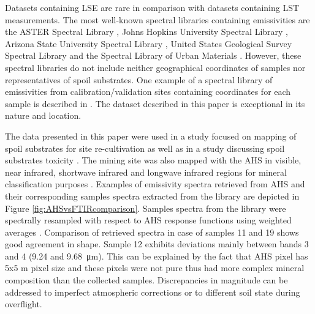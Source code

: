 \begin{appendices}
Datasets containing LSE are rare in comparison with datasets containing LST measurements. The most well-known spectral libraries containing emissivities are the ASTER Spectral Library \cite{BH09}, Johns Hopkins University Spectral Library \cite{SW91}, Arizona State University Spectral Library \cite{CB00}, United States Geological Survey Spectral Library \cite{CS16} and the Spectral Library of Urban Materials \cite{KS14}. However, these spectral libraries do not include neither geographical coordinates of samples nor representatives of spoil substrates. One example of a spectral library of emissivities from calibration/validation sites containing coordinates for each sample is described in \cite{SM09}. The dataset described in this paper is exceptional in its nature and location. 

The data presented in this paper were used in a study focused on mapping of spoil substrates for site re-cultivation \cite{Z14} as well as in a study discussing spoil substrates toxicity \cite{FK05}. The mining site was also mapped with the AHS in visible, near infrared, shortwave infrared and longwave infrared regions for mineral classification purposes \cite{NK14}. Examples of emissivity spectra retrieved from AHS and their corresponding samples spectra extracted from the library are depicted in Figure \ref{fig:AHSvsFTIRcomparison}. Samples spectra from the library were spectrally resampled with respect to AHS response functions using weighted averages \cite{LT13}. Comparison of retrieved spectra in case of samples 11 and 19 shows good agreement in shape. Sample 12 exhibits deviations mainly between bands 3 and 4 (9.24 and \SI{9.68}{\micro\meter}). This can be explained by the fact that AHS pixel has 5x5 m pixel size and these pixels were not pure thus had more complex mineral composition than the collected samples. Discrepancies in magnitude can be addressed to imperfect atmospheric corrections or to different soil state during overflight.


\end{appendices}
